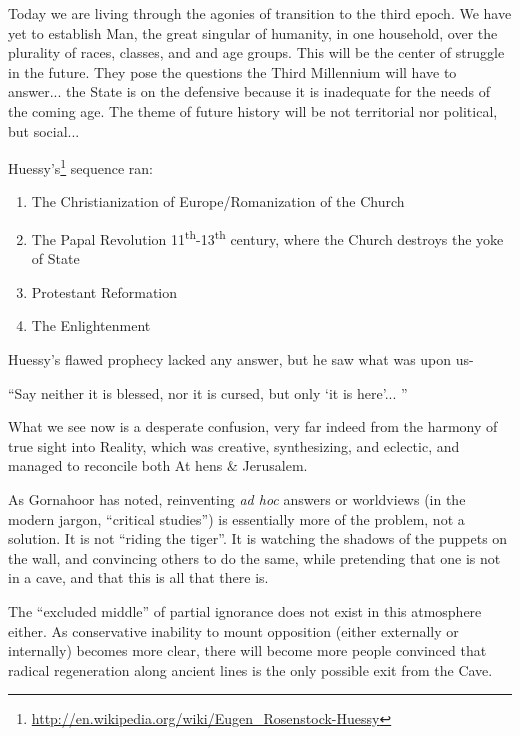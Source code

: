 \begin{quotex}
Today we are living through the agonies of transition to the third epoch. We have yet to establish Man, the great singular of humanity, in one household, over the plurality of races, classes, and and age groups. This will be the center of struggle in the future. They pose the questions the Third Millennium will have to answer... the State is on the defensive because it is inadequate for the needs of the coming age. The theme of future history will be not territorial nor political, but social...

Huessy's\footnote{\url{http://en.wikipedia.org/wiki/Eugen\_Rosenstock-Huessy}} sequence ran:

\begin{enumerate}


\item The Christianization of Europe/Romanization of the Church

\item The Papal Revolution 11\textsuperscript{th}-13\textsuperscript{th} century, where the Church destroys the yoke of State

\item Protestant Reformation

\item The Enlightenment
\end{enumerate}
\end{quotex}


Huessy's flawed prophecy lacked any answer, but he saw what was upon us-

``Say neither it is blessed, nor it is cursed, but only `it is here'... ''

What we see now is a desperate confusion, very far indeed from the harmony of true sight into Reality, which was creative, synthesizing, and eclectic, and managed to reconcile both At hens \& Jerusalem.

As Gornahoor has noted, reinventing \emph{ad hoc} answers or worldviews (in the modern jargon, ``critical studies'') is essentially more of the problem, not a solution. It is not ``riding the tiger''. It is watching the shadows of the puppets on the wall, and convincing others to do the same, while pretending that one is not in a cave, and that this is all that there is.

The ``excluded middle'' of partial ignorance does not exist in this atmosphere either. As conservative inability to mount opposition (either externally or internally) becomes more clear, there will become more people convinced that radical regeneration along ancient lines is the only possible exit from the Cave.



